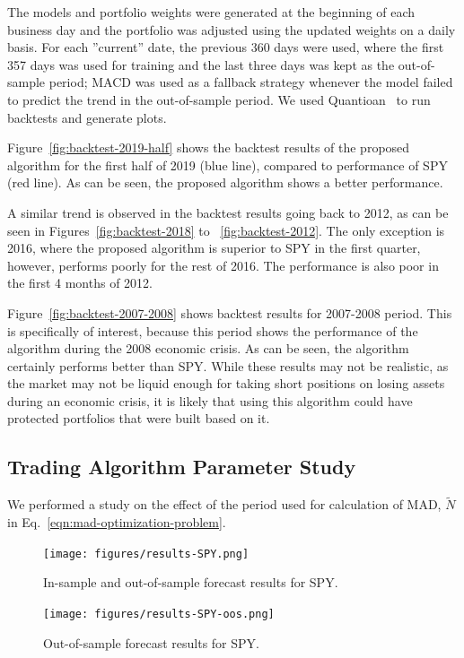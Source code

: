 \documentclass{article}
\begin{document}
The models and portfolio weights were generated at the beginning of
each business day and the portfolio was adjusted using the updated
weights on a daily basis. For each ''current'' date, the previous 360
days were used, where the first 357 days was used for training and the
last three days was kept as the out-of-sample period; MACD was used as
a fallback strategy whenever the model failed to predict the trend in
the out-of-sample period. We used Quantioan~\cite{ref:quantopian} to
run backtests and generate plots.

Figure~\ref{fig:backtest-2019-half} shows the backtest results of the
proposed algorithm for the first half of 2019 (blue line), compared to
performance of SPY (red line). As can be seen, the proposed algorithm
shows a better performance.

A similar trend is observed in the backtest results going back to
2012, as can be seen in Figures~\ref{fig:backtest-2018} to
~\ref{fig:backtest-2012}. The only exception is 2016, where the
proposed algorithm is superior to SPY in the first quarter, however,
performs poorly for the rest of 2016. The performance is also poor in
the first 4 months of 2012.

Figure~\ref{fig:backtest-2007-2008} shows backtest results for
2007-2008 period. This is specifically of interest, because this
period shows the performance of the algorithm during the 2008 economic
crisis. As can be seen, the algorithm certainly performs better than
SPY. While these results may not be realistic, as the market may not
be liquid enough for taking short positions on losing assets during an
economic crisis, it is likely that using this algorithm could have
protected portfolios that were built based on it.

\subsection{Trading Algorithm Parameter Study}\label{subsection:mad-parameter-study}

We performed a study on the effect of the period used for calculation
of MAD, $\tilde{N}$ in Eq.~\ref{eqn:mad-optimization-problem}.

\newpage

\begin{figure}
\texttt{[image: figures/results-SPY.png]}
\caption{In-sample and out-of-sample forecast results for SPY.}
\label{fig:results-spy}
\end{figure}

\begin{figure}
\texttt{[image: figures/results-SPY-oos.png]}
\caption{Out-of-sample forecast results for SPY.}
\label{fig:results-spy-oos}
\end{figure}
\end{document}
